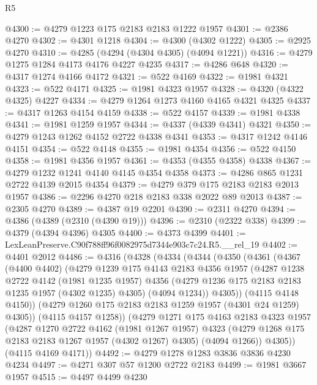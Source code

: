 \begin{lexlean}{R5}
\begin{coremodule}
@4300 := @4279 @1223 @175 @2183 @2183 @1222 @1957
@4301 := @2386 @4270
@4302 := @4301 @1218
@4304 := @4300 (@4302 @1222)
@4305 := @2925 @4270
@4310 := @4285 (@4294 (@4304 @4305) (@4094 @1221))
@4316 := @4279 @1275 @1284 @4173 @4176 @4227 @4235
@4317 := @4286 @648
@4320 := @4317 @1274 @4166 @4172
@4321 := @522 @4169
@4322 := @1981 @4321
@4323 := @522 @4171
@4325 := @1981 @4323 @1957
@4328 := @4320 (@4322 @4325) @4227
@4334 := @4279 @1264 @1273 @4160 @4165 @4321 @4325
@4337 := @4317 @1263 @4154 @4159
@4338 := @522 @4157
@4339 := @1981 @4338
@4341 := @1981 @1259 @1957
@4344 := @4337 (@4339 @4341) @4321
@4350 := @4279 @1243 @1262 @4152 @2722 @4338 @4341
@4353 := @4317 @1242 @4146 @4151
@4354 := @522 @4148
@4355 := @1981 @4354
@4356 := @522 @4150
@4358 := @1981 @4356 @1957
@4361 := @4353 (@4355 @4358) @4338
@4367 := @4279 @1232 @1241 @4140 @4145 @4354 @4358
@4373 := @4286 @865 @1231 @2722 @4139 @2015 @4354
@4379 := @4279 @379 @175 @2183 @2183 @2013 @1957
@4386 := @2296 @4270 @218 @2183 @338 @2022 @89 @2013
@4387 := @2305 @4270
@4389 := @4387 @19 @2201
@4390 := @2311 @4270
@4394 := @4386 (@4389 (@2310 (@4390 @19)))
@4396 := @2310 (@2322 @338)
@4399 := @4379 (@4394 @4396) @4305
@4400 := @4373 @4399
@4401 := LexLeanPreserve.C90f788ff96f0082975d7344e903c7c24.R5.__rel_19
@4402 := @4401 @2012
@4486 := @4316
    (@4328
      (@4334
        (@4344
          (@4350
            (@4361
              (@4367
                (@4400 @4402)
                (@4279
                  @1239
                  @175
                  @4143
                  @2183
                  @4356
                  @1957
                  (@4287
                    @1238
                    @2722
                    @4142
                    (@1981 @1235 @1957)
                    @4356
                    (@4279 @1236 @175 @2183 @2183 @1235 @1957 (@4302 @1235) @4305)
                    (@4094 @1234))
                  @4305))
              (@4115 @4148 @4150))
            (@4279 @1260 @175 @2183 @2183 @1259 @1957 (@4301 @24 @1259) @4305))
          (@4115 @4157 @1258))
        (@4279
          @1271
          @175
          @4163
          @2183
          @4323
          @1957
          (@4287
            @1270
            @2722
            @4162
            (@1981 @1267 @1957)
            @4323
            (@4279 @1268 @175 @2183 @2183 @1267 @1957 (@4302 @1267) @4305)
            (@4094 @1266))
          @4305))
      (@4115 @4169 @4171))
@4492 := @4279 @1278 @1283 @3836 @3836 @4230 @4234
@4497 := @4271 @307 @57 @1200 @2722 @2183
@4499 := @1981 @3667 @1957
@4515 := @4497
    @4499
    @4230

\end{coremodule}
\end{lexlean}
